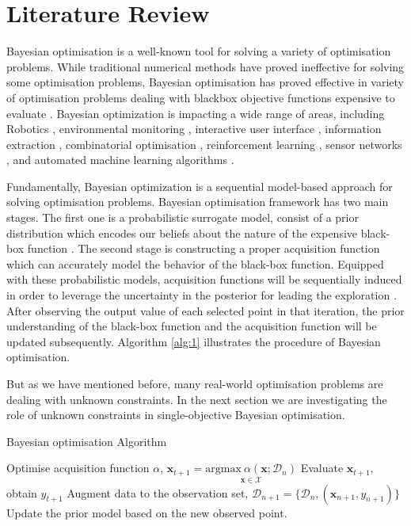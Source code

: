 \chapter{Literature Review}\label{sec:lit}


Bayesian optimisation is a well-known tool for solving a variety of optimisation problems. While traditional numerical methods have proved ineffective for solving some optimisation problems, Bayesian optimisation has proved effective in variety of optimisation problems dealing with blackbox objective functions expensive to evaluate \cite{gelbart2014bayesian}. Bayesian optimization is impacting a wide range of areas, including Robotics \cite{lizotte2007automatic,martinez2007active}, environmental monitoring \cite{marchant2012bayesian}, interactive user interface \cite{brochu2010bayesian}, information extraction \cite{wang2014bayesian}, combinatorial optimisation \cite{wang2013bayesian,hutter2011sequential}, reinforcement learning \cite{brochu2010tutorial}, sensor networks \cite{garnett2010bayesian,srinivas2009gaussian}, and automated machine learning algorithms \cite{thornton2013auto,snoek2012practical,hoffman2014correlation,garnett2013active}.
\par
Fundamentally, Bayesian optimization is a sequential model-based approach for solving optimisation problems. Bayesian optimisation framework has two main stages. The first one is a probabilistic surrogate model, consist of a prior distribution which encodes our beliefs about the nature of the expensive black-box function \cite{shahriari2016taking}. The second stage is constructing a proper acquisition function which can accurately model the behavior of the black-box function. Equipped with these probabilistic models, acquisition functions will be sequentially induced  in order to leverage the uncertainty in the posterior for leading the exploration \cite{shahriari2016taking}. After observing the output value of each selected point in that iteration, the prior understanding of the black-box function and the acquisition function will be updated subsequently. Algorithm \ref{alg:1} illustrates the procedure of Bayesian optimisation.
\par
But as we have mentioned before, many real-world optimisation problems are dealing with unknown constraints. In the next section we are investigating the role of unknown constraints in single-objective Bayesian optimisation.
\begin{algorithm}
  \caption{Bayesian optimisation Algorithm}\label{algo1}
  \begin{algorithmic}[1]
	  \State Optimise acquisition function $\alpha$,
	  $\textbf{x}_{t+1} = \underset{\textbf{x}   \in \mathcal{X}}{\mathrm{argmax}\ \alpha(\textbf{x};\mathcal{D}_n)}$
	  \State Evaluate $\textbf{x}_{t+1}$, obtain ${y}_{t+1}$
	  \State Augment data to the observation set, $\mathcal{D}_{n+1} = \{\mathcal{D}_n,(\textbf{x}_{n+1},{y}_{n+1})\}$
	  \State Update the prior model based on the new observed point.
	  \EndFor
  \end{algorithmic}
  \label{alg:1}
\end{algorithm}

